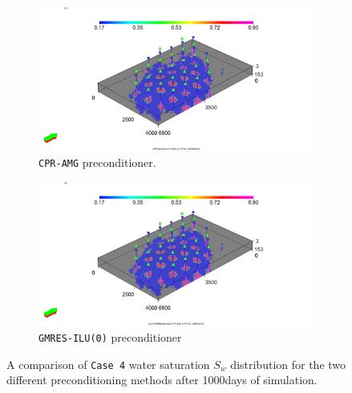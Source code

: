 \begin{figure}
\centering
\begin{subfigure}{.5\textwidth}
  \centering
  \includegraphics[width=1.3\linewidth]{figures/Case8_CPR_Sw.png}
  \caption{\texttt{CPR-AMG} preconditioner.}
\end{subfigure}%
\begin{subfigure}{.5\textwidth}
  \centering
  \includegraphics[width=1.3\linewidth]{figures/Case8_ILU-GMRES_Sw.png}
  \caption{\texttt{GMRES-ILU(0)} preconditioner}
\end{subfigure}
\caption{A comparison of \texttt{Case 4} water saturation $S_{w}$ distribution for the two different preconditioning methods after 1000days of simulation.}
\label{case4sw}
\end{figure}

